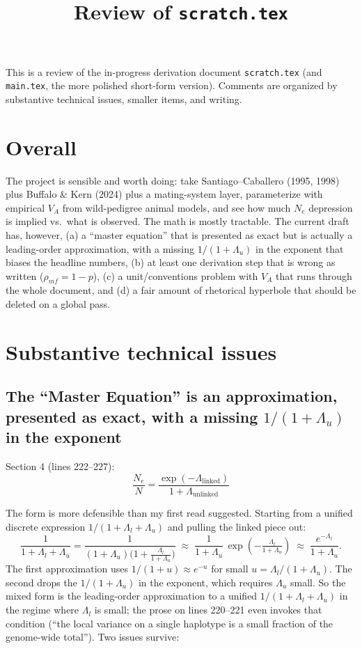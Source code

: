 \documentclass[11pt]{article}
\title{Review of \texttt{scratch.tex}}
\author{}
\date{}
\begin{document}
\maketitle

This is a review of the in-progress derivation document
\texttt{scratch.tex} (and \texttt{main.tex}, the more polished
short-form version). Comments are organized by substantive technical
issues, smaller items, and writing.

\section*{Overall}

The project is sensible and worth doing: take Santiago--Caballero
(1995, 1998) plus Buffalo \& Kern (2024) plus a mating-system layer,
parameterize with empirical $V_A$ from wild-pedigree animal models,
and see how much $N_e$ depression is implied vs.\ what is observed.
The math is mostly tractable. The current draft has, however, (a) a
``master equation'' that is presented as exact but is actually a
leading-order approximation, with a missing $1/(1+\Lambda_u)$ in the
exponent that biases the headline numbers, (b) at least one derivation
step that is wrong as written ($\rho_{mf} = 1-p$), (c) a
unit/conventions problem with $V_A$ that runs through the whole
document, and (d) a fair amount of rhetorical hyperbole that should be
deleted on a global pass.

\section{Substantive technical issues}

\subsection{The ``Master Equation'' is an approximation, presented as exact, with a missing $1/(1+\Lambda_u)$ in the exponent}

Section 4 (lines 222--227):
\[
\frac{N_e}{N} = \frac{\exp(-\Lambda_{\text{linked}})}{1 + \Lambda_{\text{unlinked}}}
\]

The form is more defensible than my first read suggested. Starting
from a unified discrete expression $1/(1+\Lambda_l + \Lambda_u)$ and
pulling the linked piece out:
\[
\frac{1}{1+\Lambda_l + \Lambda_u}
= \frac{1}{(1+\Lambda_u)\big(1 + \tfrac{\Lambda_l}{1+\Lambda_u}\big)}
\;\approx\; \frac{1}{1+\Lambda_u}\,\exp\!\left(-\tfrac{\Lambda_l}{1+\Lambda_u}\right)
\;\approx\; \frac{e^{-\Lambda_l}}{1+\Lambda_u}.
\]
The first approximation uses $1/(1+u) \approx e^{-u}$ for small
$u = \Lambda_l/(1+\Lambda_u)$. The second drops the $1/(1+\Lambda_u)$
in the exponent, which requires $\Lambda_u$ small. So the mixed form
is the leading-order approximation to a unified
$1/(1+\Lambda_l+\Lambda_u)$ in the regime where $\Lambda_l$ is small;
the prose on lines 220--221 even invokes that condition (``the local
variance on a single haplotype is a small fraction of the genome-wide
total''). Two issues survive:
\end{document}
